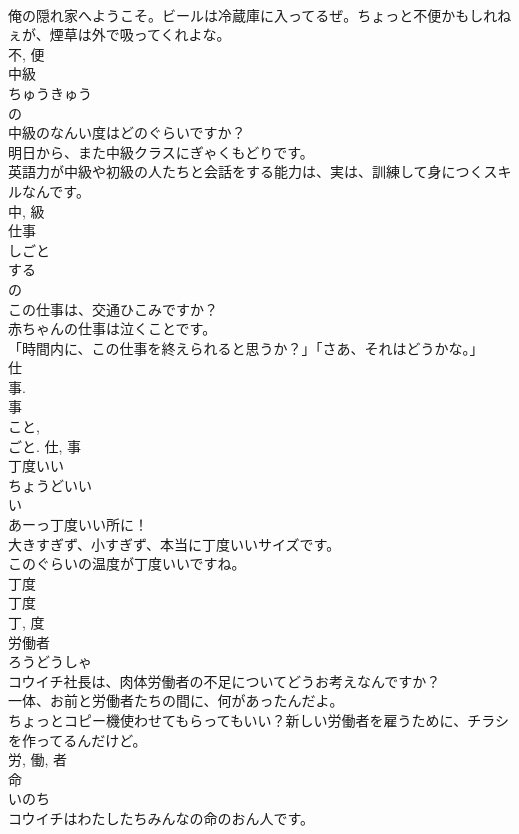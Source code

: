 \documentclass[8pt]{extreport}
\begin{document}
\begin{CJK}{UTF8}{min}
\\	俺の隠れ家へようこそ。ビールは冷蔵庫に入ってるぜ。ちょっと不便かもしれねぇが、煙草は外で吸ってくれよな。	
\\	不, 便	
\\	中級	
\\	ちゅうきゅう	
\\	の 
\\	中級のなんい度はどのぐらいですか？	
\\	明日から、また中級クラスにぎゃくもどりです。	
\\	英語力が中級や初級の人たちと会話をする能力は、実は、訓練して身につくスキルなんです。	
\\	中, 級	
\\	仕事	
\\	しごと	
\\	する 
\\	の 
\\	この仕事は、交通ひこみですか？	
\\	赤ちゃんの仕事は泣くことです。	
\\	「時間内に、この仕事を終えられると思うか？」「さあ、それはどうかな。」	
\\	仕 
\\	事. 
\\	事 
\\	こと, 
\\	ごと.	仕, 事	
\\	丁度いい	
\\	ちょうどいい	
\\	い 
\\	あーっ丁度いい所に！	
\\	大きすぎず、小すぎず、本当に丁度いいサイズです。	
\\	このぐらいの温度が丁度いいですね。	
\\	丁度 
\\	丁度 
\\	丁, 度	
\\	労働者	
\\	ろうどうしゃ	
\\	コウイチ社長は、肉体労働者の不足についてどうお考えなんですか？	
\\	一体、お前と労働者たちの間に、何があったんだよ。	
\\	ちょっとコピー機使わせてもらってもいい？新しい労働者を雇うために、チラシを作ってるんだけど。	
\\	労, 働, 者	
\\	命	
\\	いのち	
\\	コウイチはわたしたちみんなの命のおん人です。	

\end{CJK}
\end{document}
